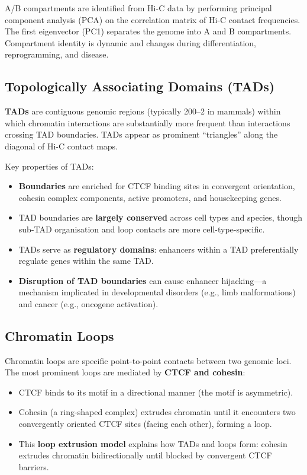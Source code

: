 A/B compartments are identified from Hi-C data by performing principal component analysis (PCA) on the correlation matrix of Hi-C contact frequencies. The first eigenvector (PC1) separates the genome into A and B compartments. Compartment identity is dynamic and changes during differentiation, reprogramming, and disease.

\subsection{Topologically Associating Domains (TADs)}
\label{subsec:3dgenome:tads}

\textbf{TADs} are contiguous genomic regions (typically 200\kilobase{}--2\megabase{} in mammals) within which chromatin interactions are substantially more frequent than interactions crossing TAD boundaries. TADs appear as prominent ``triangles'' along the diagonal of Hi-C contact maps.

Key properties of TADs:
\begin{itemize}[itemsep=2pt]
  \item \textbf{Boundaries} are enriched for CTCF binding sites in convergent orientation, cohesin complex components, active promoters, and housekeeping genes.
  \item TAD boundaries are \textbf{largely conserved} across cell types and species, though sub-TAD organisation and loop contacts are more cell-type-specific.
  \item TADs serve as \textbf{regulatory domains}: enhancers within a TAD preferentially regulate genes within the same TAD.
  \item \textbf{Disruption of TAD boundaries} can cause enhancer hijacking---a mechanism implicated in developmental disorders (e.g., limb malformations) and cancer (e.g., oncogene activation).
\end{itemize}

\subsection{Chromatin Loops}
\label{subsec:3dgenome:loops}

Chromatin loops are specific point-to-point contacts between two genomic loci. The most prominent loops are mediated by \textbf{CTCF and cohesin}:

\begin{itemize}[itemsep=2pt]
  \item CTCF binds to its motif in a directional manner (the motif is asymmetric).
  \item Cohesin (a ring-shaped complex) extrudes chromatin until it encounters two convergently oriented CTCF sites (facing each other), forming a loop.
  \item This \textbf{loop extrusion model} explains how TADs and loops form: cohesin extrudes chromatin bidirectionally until blocked by convergent CTCF barriers.
\end{itemize}


